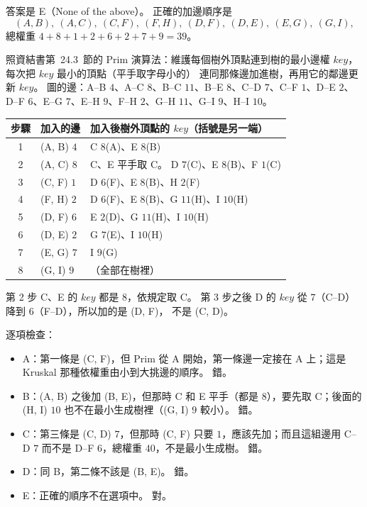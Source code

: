 \begin{pastsoln}
答案是 E（None of the above）。 正確的加邊順序是
\[
(A, B),\ (A, C),\ (C, F),\ (F, H),\ (D, F),\ (D, E),\ (E, G),\ (G, I),
\]
總權重 $4 + 8 + 1 + 2 + 6 + 2 + 7 + 9 = 39$。

照資結書第~24.3~節的 Prim 演算法：維護每個樹外頂點連到樹的最小邊權 $\mathit{key}$，每次把 $\mathit{key}$ 最小的頂點（平手取字母小的）
連同那條邊加進樹，再用它的鄰邊更新 $\mathit{key}$。 圖的邊：A--B $4$、A--C $8$、B--C $11$、B--E $8$、C--D $7$、C--F $1$、D--E $2$、
D--F $6$、E--G $7$、E--H $9$、F--H $2$、G--H $11$、G--I $9$、H--I $10$。
\begin{center}
\small
\begin{tabular}{cll}
\toprule
步驟 & 加入的邊 & 加入後樹外頂點的 $\mathit{key}$（括號是另一端） \\
\midrule
1 & (A, B) $4$ & C $8$(A)、E $8$(B) \\
2 & (A, C) $8$ & C、E 平手取 C。 D $7$(C)、E $8$(B)、F $1$(C) \\
3 & (C, F) $1$ & D $6$(F)、E $8$(B)、H $2$(F) \\
4 & (F, H) $2$ & D $6$(F)、E $8$(B)、G $11$(H)、I $10$(H) \\
5 & (D, F) $6$ & E $2$(D)、G $11$(H)、I $10$(H) \\
6 & (D, E) $2$ & G $7$(E)、I $10$(H) \\
7 & (E, G) $7$ & I $9$(G) \\
8 & (G, I) $9$ & （全部在樹裡） \\
\bottomrule
\end{tabular}
\end{center}
第 2 步 C、E 的 $\mathit{key}$ 都是 $8$，依規定取 C。 第 3 步之後 D 的 $\mathit{key}$ 從 $7$（C--D）降到 $6$（F--D），所以加的是 (D, F)，
不是 (C, D)。

逐項檢查：
\begin{itemize}
\item A：第一條是 (C, F)，但 Prim 從 A 開始，第一條邊一定接在 A 上；這是 Kruskal 那種依權重由小到大挑邊的順序。 錯。
\item B：(A, B) 之後加 (B, E)，但那時 C 和 E 平手（都是 $8$），要先取 C；後面的 (H, I) $10$ 也不在最小生成樹裡（(G, I) $9$ 較小）。 錯。
\item C：第三條是 (C, D) $7$，但那時 (C, F) 只要 $1$，應該先加；而且這組邊用 C--D $7$ 而不是 D--F $6$，總權重 $40$，不是最小生成樹。 錯。
\item D：同 B，第二條不該是 (B, E)。 錯。
\item E：正確的順序不在選項中。 對。
\end{itemize}
\end{pastsoln}
